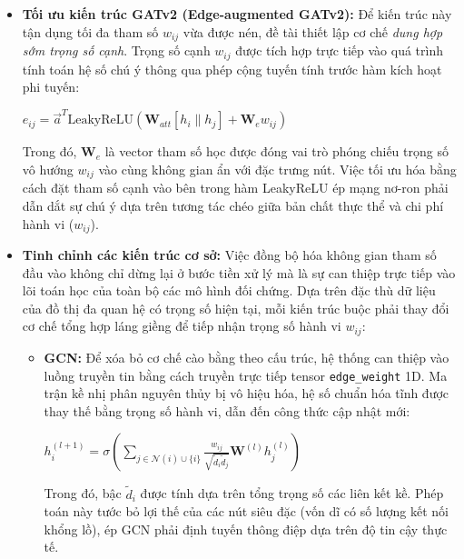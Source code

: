 \begin{itemize}[label={--}, itemsep=5pt]
        \item \textbf{Tối ưu kiến trúc GATv2 (Edge-augmented GATv2):} Để kiến trúc này tận dụng tối đa tham số $w_{ij}$ vừa được nén, đề tài thiết lập cơ chế \textit{dung hợp sớm trọng số cạnh}. Trọng số cạnh $w_{ij}$ được tích hợp trực tiếp vào quá trình tính toán hệ số chú ý thông qua phép cộng tuyến tính trước hàm kích hoạt phi tuyến:
        \begin{center}
        \(
            e_{ij} = \vec{a}^T \text{LeakyReLU}\left( \mathbf{W}_{att} [h_i \| h_j] + \mathbf{W}_e w_{ij} \right)
         \)
        \end{center}
        Trong đó, $\mathbf{W}_e$ là vector tham số học được đóng vai trò phóng chiếu trọng số vô hướng $w_{ij}$ vào cùng không gian ẩn với đặc trưng nút. Việc tối ưu hóa bằng cách đặt tham số cạnh vào bên trong hàm LeakyReLU ép mạng nơ-ron phải dẫn dắt sự chú ý dựa trên tương tác chéo giữa bản chất thực thể và chi phí hành vi ($w_{ij}$).

        \item \textbf{Tinh chỉnh các kiến trúc cơ sở:} Việc đồng bộ hóa không gian tham số đầu vào không chỉ dừng lại ở bước tiền xử lý mà là sự can thiệp trực tiếp vào lõi toán học của toàn bộ các mô hình đối chứng. Dựa trên đặc thù dữ liệu của đồ thị đa quan hệ có trọng số hiện tại, mỗi kiến trúc buộc phải thay đổi cơ chế tổng hợp láng giềng để tiếp nhận trọng số hành vi $w_{ij}$:

        \begin{itemize}[label={+}, itemsep=4pt]

            \item \textbf{GCN:} Để xóa bỏ cơ chế cào bằng theo cấu trúc, hệ thống can thiệp vào luồng truyền tin bằng cách truyền trực tiếp tensor \texttt{edge\_weight} 1D. Ma trận kề nhị phân nguyên thủy bị vô hiệu hóa, hệ số chuẩn hóa tĩnh được thay thế bằng trọng số hành vi, dẫn đến công thức cập nhật mới:
            \begin{center}
            \(
                h_i^{(l+1)} = \sigma \left( \sum_{j \in \mathcal{N}(i) \cup \{i\}} \frac{w_{ij}}{\sqrt{\tilde{d}_i \tilde{d}_j}} \mathbf{W}^{(l)} h_j^{(l)} \right)
             \)
            \end{center}
            Trong đó, bậc $\tilde{d}_i$ được tính dựa trên tổng trọng số các liên kết kề. Phép toán này tước bỏ lợi thế của các nút siêu đặc (vốn dĩ có số lượng kết nối khổng lồ), ép GCN phải định tuyến thông điệp dựa trên độ tin cậy thực tế.


\end{itemize}
\end{itemize}
